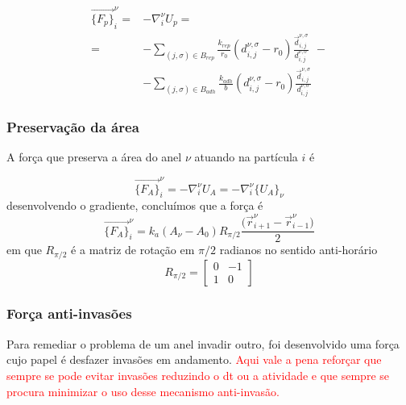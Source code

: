 \documentclass{article}
\theoremstyle{definition}
\def \quantity#1#2#3{\vec{#1}_{#2}^{#3}}
\def \quantitysc#1#2#3{{#1}_{#2}^{#3}}
\def \quantityg#1#2#3#4#5{\vec{#1}_{#2, #3}^{#4, #5}}
\def \quantitygsc#1#2#3#4#5{{#1}_{#2, #3}^{#4, #5}}
\def \deslocg#1#2#3#4{\quantityg{d}{#1}{#2}{#3}{#4}}
\def \deslocgsc#1#2#3#4{\quantitygsc{d}{#1}{#2}{#3}{#4}}
\begin{document}
\begin{equation}
\begin{aligned}
    \quantity{\{F_p\}}{i}{\nu} = &- \quantitysc{\nabla}{i}{\nu} U_p = \\ 
    = &-\sum_{(j, \sigma) \in B_{rep}} \frac{k_{rep}}{r_0}(\deslocgsc{i}{j}{\nu}{\sigma} - r_0)\frac{\deslocg{i}{j}{\nu}{\sigma}}{\deslocgsc{i}{j}{\nu}{\sigma}} ~~-\\
    &-\sum_{(j, \sigma) \in B_{adh}} \frac{k_{adh}}{b}(\deslocgsc{i}{j}{\nu}{\sigma} - r_0)\frac{\deslocg{i}{j}{\nu}{\sigma}}{\deslocgsc{i}{j}{\nu}{\sigma}}
\end{aligned}
\label{eq:force_particle_particle}
\end{equation}

\subsubsection{Preservação da área}
A força que preserva a área do anel $\nu$ atuando na partícula $i$ é

\[    
\quantity{\{F_A\}}{i}{\nu} = - \quantitysc{\nabla}{i}{\nu}U_A = -\quantitysc{\nabla}{i}{\nu} \{U_A\}_\nu
\]
desenvolvendo o gradiente, concluímos que a força é
\begin{equation}
    \quantity{\{F_A\}}{i}{\nu} = k_a (A_\nu - A_0) R_{\pi/2}\frac{\big( \quantity{r}{i+1}{\nu} - \quantity{r}{i-1}{\nu}\big)}{2}
\label{eq:force_area}
\end{equation}
em que $R_{\pi/2}$ é a matriz de rotação em $\pi/2$ radianos no sentido anti-horário
\[
    R_{\pi/2} = \begin{bmatrix}
        0 &-1 \\
        1 &0
    \end{bmatrix}
\]

\subsubsection{Força anti-invasões}
Para remediar o problema de um anel invadir outro, foi desenvolvido uma força cujo papel é desfazer invasões em andamento.
\textcolor{red}{Aqui vale a pena reforçar que sempre se pode evitar invasões reduzindo o dt ou a atividade e que sempre se procura minimizar o uso desse mecanismo anti-invasão. }
\end{document}
